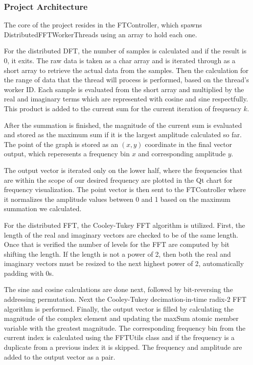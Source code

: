 \documentclass[journal]{IEEEtran}
\begin{document}
\subsubsection{Project Architecture}
    \par{
		The core of the project resides in the FTController, which spawns DistributedFFTWorkerThreads using an array to hold each one.
	}
    \par{
		For the distributed DFT, the number of samples is calculated and if the result is 0, it exits. 
		The raw data is taken as a char array and is iterated through as a short array to retrieve the actual
		data from the samples. Then the calculation 
		for the range of data that the thread will process is performed, based on the thread's worker ID. 
		Each sample is evaluated from the 
		short array and multiplied by the real and imaginary terms which are represented with cosine and sine 
		respectfully. This product is added to the current sum for the current iteration of frequency $k$.
	}
    \par{
		After the summation is finished, the magnitude of the current sum is evaluated and stored as the maximum sum if it is the largest amplitude calculated so far. 
		The point of the graph is stored as an $(x,y)$ coordinate in the final vector output, which reperesents a
		frequency bin $x$ and corresponding amplitude $y$.
	}
    \par{
		The output vector is iterated only on the lower half, where the frequencies that are within the scope 
		of our desired frequency are plotted in the Qt chart for frequency visualization. The point vector is then
		sent to the FTController where it normalizes the amplitude values
		between 0 and 1 based on the maximum summation we calculated.
	}
    \par{
		For the distributed FFT, the Cooley-Tukey FFT algorithm is utilized. First, the length of the real and imaginary 
		vectors are checked to be of the same length. Once that is verified the number of levels for the FFT are 
		computed by bit shifting the length. If the length is not a power of 2, then both the real and imaginary 
		vectors must be resized to the next highest power of 2, automatically padding
		with 0s. 
	}
    \par{
		The sine and cosine calculations are done next, followed by bit-reversing the addressing permutation. 
		Next the Cooley-Tukey decimation-in-time radix-2 FFT algorithm is performed. Finally, the output vector is 
		filled by calculating the magnitude of the complex element and updating the maxSum atomic member 
		variable with the greatest magnitude.  The corresponding frequency bin from the current 
		index is calculated using the FFTUtils class and if the frequency is a duplicate from a previous index 
		it is skipped. The frequency and amplitude are added to the output vector as a pair.
	}
\end{document}
